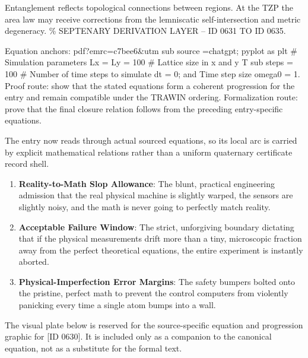 Entanglement reflects topological connections between regions. At the TZP the area law may receive corrections from the lemniscatic self-intersection and metric degeneracy. \% SEPTENARY DERIVATION LAYER -- ID 0631 TO ID 0635.

Equation anchors: pdf?emrc=c7bee6\&utm sub source =chatgpt; pyplot as plt \# Simulation parameters Lx = Ly = 100 \# Lattice size in x and y T sub steps = 100 \# Number of time steps to simulate dt = 0; and Time step size omega0 = 1. Proof route: show that the stated equations form a coherent progression for the entry and remain compatible under the TRAWIN ordering. Formalization route: prove that the final closure relation follows from the preceding entry-specific equations.

The entry now reads through actual sourced equations, so its local arc is carried by explicit mathematical relations rather than a uniform quaternary certificate record shell.
\endgroup

\begin{enumerate}[leftmargin=1.6em,itemsep=6pt,topsep=4pt]
\item \textbf{Reality-to-Math Slop Allowance}: The blunt, practical engineering admission that the real physical machine is slightly warped, the sensors are slightly noisy, and the math is never going to perfectly match reality.
\item \textbf{Acceptable Failure Window}: The strict, unforgiving boundary dictating that if the physical measurements drift more than a tiny, microscopic fraction away from the perfect theoretical equations, the entire experiment is instantly aborted.
\item \textbf{Physical-Imperfection Error Margins}: The safety bumpers bolted onto the pristine, perfect math to prevent the control computers from violently panicking every time a single atom bumps into a wall.
\end{enumerate}

\begingroup\footnotesize\sloppy
The visual plate below is reserved for the source-specific equation and progression graphic for [ID 0630]. It is included only as a companion to the canonical equation, not as a substitute for the formal text.
\par\endgroup
\ifTZPDarkEdition
{}
\fi

